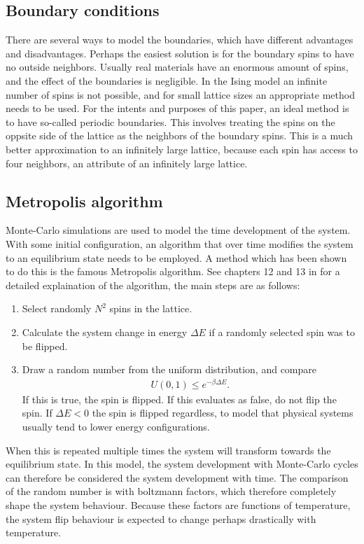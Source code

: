 \documentclass[aps,reprint]{revtex4-1}
\begin{document}
\subsection{Boundary conditions}
There are several ways to model the boundaries, which have different advantages
and disadvantages. Perhaps the easiest solution is for the boundary spins to have
no outside neighbors. Usually real materials have an enormous amount of spins,
and the effect of the boundaries is negligible. In the Ising model an infinite
number of spins is not possible, and for small lattice sizes an appropriate
method needs to be used. For the intents and purposes of this paper, an ideal
method is to have so-called periodic boundaries. This involves treating the
spins on the oppsite side of the lattice as the neighbors of the boundary spins.
This is a much better approximation to an infinitely large lattice, because
each spin has access to four neighbors, an attribute of an infinitely large lattice.

\subsection{Metropolis algorithm} \label{sec:theory_metro}
Monte-Carlo simulations are used to model the time development of the system.
With some initial configuration, an algorithm that over time modifies the system
to an equilibrium state needs to be employed. A method which has been shown to
do this is the famous Metropolis algorithm. See chapters 12 and 13 in \cite{mortenjensen} for a detailed explaination
of the algorithm, the main steps are as follows:
\begin{enumerate}
  \item Select randomly $N^2$ spins in the lattice.
  \item Calculate the system change in energy $\Delta E$ if a randomly selected spin was to
  be flipped.
  \item Draw a random number from the uniform distribution, and compare
  \begin{align*}
    U(0,1) \leq e^{-\beta \Delta E}.
  \end{align*}
  If this is true, the spin is flipped. If this evaluates as false, do not flip
  the spin. If $\Delta E < 0$ the spin is flipped regardless, to model that physical
  systems usually tend to lower energy configurations.
\end{enumerate}
When this is repeated multiple times the system will transform towards the equilibrium
state. In this model, the system development with Monte-Carlo cycles can therefore be
considered the system development with time. The comparison of the random number
is with boltzmann factors, which therefore completely shape the system behaviour.
Because these factors are functions of temperature, the system flip behaviour is
expected to change perhaps drastically with temperature.
\end{document}
